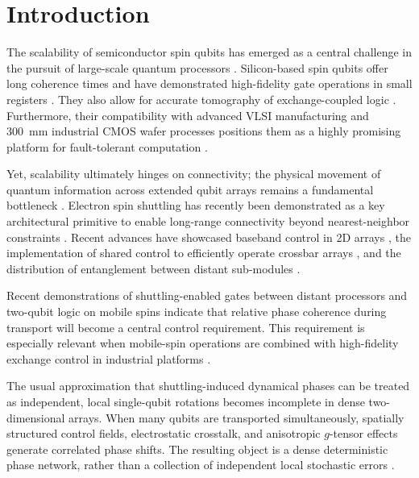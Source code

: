 \documentclass[a4paper,twocolumn,11pt]{quantumarticle}
\begin{document}
\section{Introduction}

The scalability of semiconductor spin qubits has emerged as a central challenge in the pursuit of large-scale quantum processors \cite{vandersypen_interfacing_2017}. Silicon-based spin qubits offer long coherence times and have demonstrated high-fidelity gate operations in small registers \cite{reiner_high-fidelity_2024, kim_quantum_2014}. They also allow for accurate tomography of exchange-coupled logic \cite{stemp_tomography_2024}. Furthermore, their compatibility with advanced VLSI manufacturing \cite{meunier_silicon_2025} and 300~mm industrial CMOS wafer processes \cite{koch_industrial_2025} positions them as a highly promising platform for fault-tolerant computation \cite{watson_programmable_2018, aharonov_fault-tolerant_2008}. 

Yet, scalability ultimately hinges on connectivity; the physical movement of quantum information across extended qubit arrays remains a fundamental bottleneck \cite{burkard_semiconductor_2023, hu_single-electron_2025}. Electron spin shuttling has recently been demonstrated as a key architectural primitive to enable long-range connectivity beyond nearest-neighbor constraints \cite{mills_shuttling_2019, seidler_conveyor-mode_2022}. Recent advances have showcased baseband control in 2D arrays \cite{unseld_baseband_2025}, the implementation of shared control to efficiently operate crossbar arrays \cite{borsoi_shared_2024}, and the distribution of entanglement between distant sub-modules \cite{ademi_distributing_2026}. 

Recent demonstrations of shuttling-enabled gates between distant processors \cite{noiri_shuttling-based_2022} and two-qubit logic on mobile spins \cite{matsumoto_two-qubit_2025} indicate that relative phase coherence during transport will become a central control requirement. This requirement is especially relevant when mobile-spin operations are combined with high-fidelity exchange control in industrial platforms \cite{chittock-wood_radio-frequency_2024}.

The usual approximation that shuttling-induced dynamical phases can be treated as independent, local single-qubit rotations \cite{de_smet_high-fidelity_2025} becomes incomplete in dense two-dimensional arrays. When many qubits are transported simultaneously, spatially structured control fields, electrostatic crosstalk, and anisotropic $g$-tensor effects \cite{geyer_anisotropic_2024, fedele_simultaneous_2021} generate correlated phase shifts. The resulting object is a dense deterministic phase network, rather than a collection of independent local stochastic errors \cite{cifuentes_impact_2024, jin_probing_2024, blume-kohout_demonstration_2017, wilen_correlated_2021}.
\end{document}
